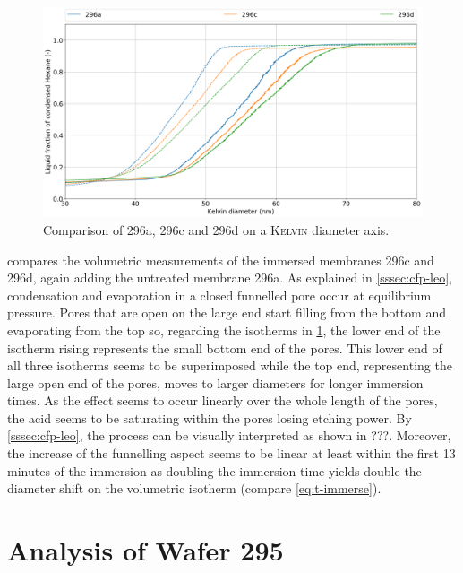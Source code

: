 \documentclass[thesis.tex]{subfiles}
\begin{document}
            \begin{figure}[ht]
                \centering
                \includegraphics[width=\textwidth]{images/296a_vs_296c_vs_296d_d_kelvin.png}
                \caption{Comparison of 296a, 296c and 296d on a \textsc{Kelvin} diameter axis. }
                \label{fig:immersed-comp-w296}
            \end{figure}

             compares the volumetric measurements of the immersed membranes 296c and 296d, again adding the untreated membrane 296a. As explained in \cref{sssec:cfp-leo}, condensation and evaporation in a closed funnelled pore occur at equilibrium pressure. Pores that are open on the large end start filling from the bottom and evaporating from the top so, regarding the isotherms in \cref{fig:immersed-comp-w296}, the lower end of the isotherm rising represents the small bottom end of the pores. This lower end of all three isotherms seems to be superimposed while the top end, representing the large open end of the pores, moves to larger diameters for longer immersion times. As the effect seems to occur linearly over the whole length of the pores, the acid seems to be saturating within the pores losing etching power. By \cref{sssec:cfp-leo}, the process can be visually interpreted as shown in ???. Moreover, the increase of the funnelling aspect seems to be linear at least within the first 13 minutes of the immersion as doubling the immersion time yields double the diameter shift on the volumetric isotherm (compare \cref{eq:t-immerse}).

            


    \section{Analysis of Wafer 295}
    \label{sec:wafer295}
\end{document}
